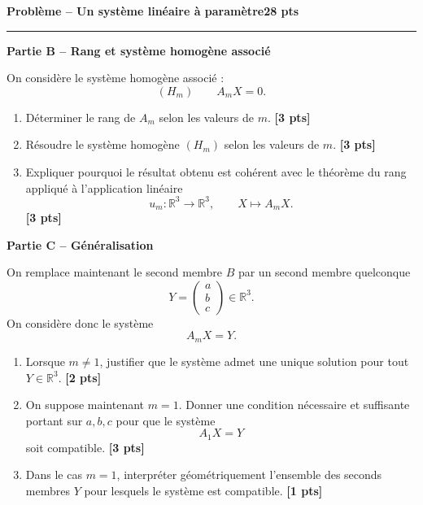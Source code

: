 \documentclass[11pt,a4paper]{article}
\newcommand{\pts}[1]{\hfill \textbf{[#1 pts]}}
\newcommand{\R}{\mathbb{R}}
\newcounter{probleme}
\newenvironment{probleme}[2]{
    \refstepcounter{probleme}
    \vspace{0.5cm}
    {\Large\color{bleu}\textbf{Problème \theprobleme{} -- #1}}\hfill \textbf{#2 pts}
    \par\medskip
    \hrule
    \medskip
}{\vspace{0.4cm}}
\newcommand{\partie}[1]{
    \vspace{0.25cm}
    {\large\color{gris}\textbf{#1}}
    \par\smallskip
}
\begin{document}
\begin{probleme}{Un système linéaire à paramètre}{28}
\partie{Partie B -- Rang et système homogène associé}

On considère le système homogène associé :
\[
(H_m)\qquad A_mX=0.
\]

\begin{enumerate}[resume]
    \item Déterminer le rang de \(A_m\) selon les valeurs de \(m\). \pts{3}

    \item Résoudre le système homogène \((H_m)\) selon les valeurs de \(m\). \pts{3}

    \item Expliquer pourquoi le résultat obtenu est cohérent avec le théorème du rang appliqué à l'application linéaire
    \[
    u_m:\R^3\longrightarrow\R^3,
    \qquad
    X\longmapsto A_mX.
    \]
    \pts{3}
\end{enumerate}

\partie{Partie C -- Généralisation}

On remplace maintenant le second membre \(B\) par un second membre quelconque
\[
Y=
\begin{pmatrix}
a\\b\\c
\end{pmatrix}
\in\R^3.
\]
On considère donc le système
\[
A_mX=Y.
\]

\begin{enumerate}[resume]
    \item Lorsque \(m\neq 1\), justifier que le système admet une unique solution pour tout \(Y\in\R^3\). \pts{2}

    \item On suppose maintenant \(m=1\). Donner une condition nécessaire et suffisante portant sur \(a,b,c\) pour que le système
    \[
    A_1X=Y
    \]
    soit compatible. \pts{3}

    \item Dans le cas \(m=1\), interpréter géométriquement l'ensemble des seconds membres \(Y\) pour lesquels le système est compatible. \pts{1}
\end{enumerate}

\end{probleme}
\end{document}
